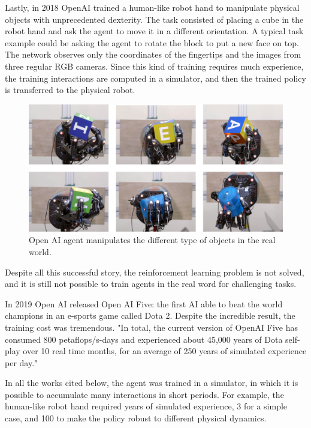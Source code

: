 Lastly, in 2018 OpenAI \cite{andrychowicz2020learning} trained a human-like robot hand to manipulate physical objects with unprecedented dexterity. 
The task consisted of placing a cube in the robot hand and ask the agent to move it in a different orientation.
A typical task example could be asking the agent to rotate the block to put a new face on top. The network observes only the coordinates of the fingertips and the images from three regular RGB cameras.
Since this kind of training requires much experience, the training interactions are computed in a simulator, and then the trained policy is transferred to the physical robot.

\begin{figure}[H]
\centering
\includegraphics[width=1.\textwidth, height=.3\textheight]{pictures/robot_hand}
\caption{ Open AI agent manipulates the different type of objects in the real world.}
            \end{figure}
            

Despite all this successful story, the reinforcement learning problem is not solved, and it is still not possible to train agents in the real word for challenging tasks.

In 2019 Open AI released Open AI Five: the first AI able to beat the world champions in an e-sports game called Dota 2. 
Despite the incredible result, the training cost was tremendous.
"In total, the current version of OpenAI Five has consumed 800 petaflops/s-days and experienced about 45,000 years of Dota self-play over 10 real time months, for an average of 250 years of simulated experience per day."

In all the works cited below, the agent was trained in a simulator, in which it is possible to accumulate many interactions in short periods.
For example, the human-like robot hand required years of simulated experience, 3 for a simple case, and 100 to make the policy robust to different physical dynamics.


